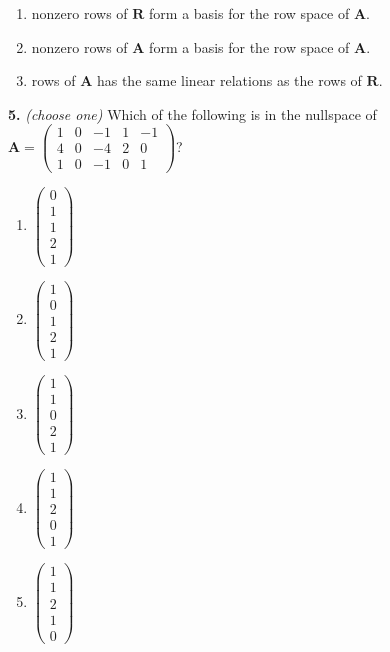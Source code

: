 \documentclass[10pt,a4paper]{article}
\begin{document}
\begin{enumerate}[label=(\Alph*)]
\item nonzero rows of \(\mathbf{R}\) form a basis for the row space of \(\mathbf{A}\).
\item nonzero rows of \(\mathbf{A}\) form a basis for the row space of \(\mathbf{A}\).
\item rows of \(\mathbf{A}\) has the same linear relations as the rows of \(\mathbf{R}\).
\end{enumerate}
\smallskip
\textbf{5.} \textit{(choose one)} Which of the following is in the nullspace of \(\mathbf{A}=\begin{pmatrix}      1  &   0  &  -1  &   1 &  -1\\      4  &   0  &  -4  &   2 &    0\\      1  &   0  &  -1  &   0  &   1 \end{pmatrix}\)?

\begin{enumerate}[label=(\Alph*)]
\item \(\begin{pmatrix}0\\1\\1\\2\\1\end{pmatrix}\)
\item \(\begin{pmatrix}1\\0\\1\\2\\1\end{pmatrix}\)
\item \(\begin{pmatrix}1\\1\\0\\2\\1\end{pmatrix}\)
\item \(\begin{pmatrix}1\\1\\2\\0\\1\end{pmatrix}\)
\item \(\begin{pmatrix}1\\1\\2\\1\\0\end{pmatrix}\)
\end{enumerate}
\smallskip
\end{document}
